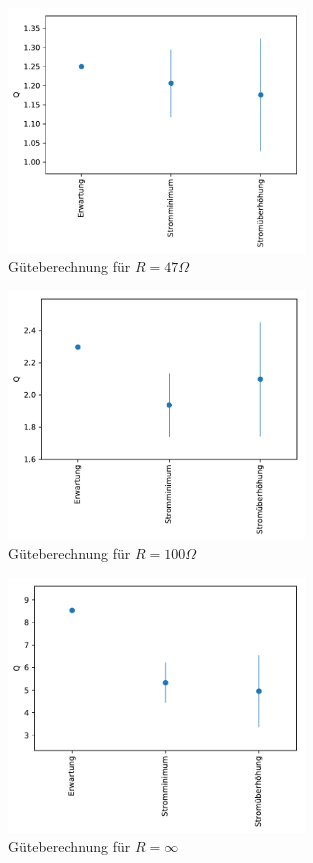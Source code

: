 \documentclass[12pt,a4paper]{article}
\begin{document}
\begin{figure}[H]
	\centering
	\includegraphics[width=0.7\textwidth]{Python/P47_Fazit.pdf}
	\caption{Güteberechnung für $R=47\Omega$}
	\label{P47_Fazit}
\end{figure}
\begin{figure}[H]
	\centering
	\includegraphics[width=0.7\textwidth]{Python/P100_Fazit.pdf}
	\caption{Güteberechnung für $R=100\Omega$}
	\label{P100_Fazit}
\end{figure}
\begin{figure}[H]
\centering
\includegraphics[width=0.7\textwidth]{Python/Pinf_Fazit.pdf}
\caption{Güteberechnung für $R=\infty$}
\label{Pinf_Fazit}
\end{figure}
\end{document}
